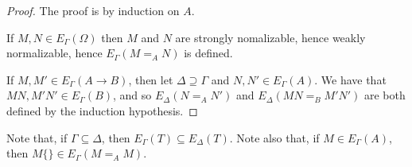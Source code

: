 \begin{proof}
The proof is by induction on $A$.

If $M, N \in E_\Gamma(\Omega)$ then $M$ and $N$ are strongly nomalizable, hence weakly normalizable, hence $E_\Gamma(M =_A N)$ is defined.

If $M, M' \in E_\Gamma(A \rightarrow B)$, then let $\Delta \supseteq \Gamma$ and $N, N' \in E_\Gamma(A)$.  We have that $MN, M'N' \in E_\Gamma(B)$,
and so $E_\Delta(N =_A N')$ and $E_\Delta(MN =_B M'N')$ are both defined by the induction hypothesis.
\end{proof}


Note that, if $\Gamma \subseteq \Delta$, then $E_\Gamma(T) \subseteq E_\Delta(T)$.  Note also that, if $M \in E_\Gamma(A)$,
then $M \{\} \in E_\Gamma(M =_A M)$. %

